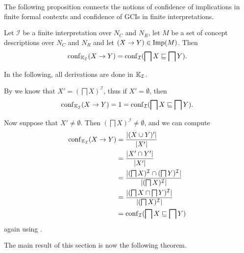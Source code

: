 The following proposition connects the notions of confidence of implications in finite
formal contexts and confidence of GCIs in finite interpretations.

\begin{Proposition}
  \label{prop:confidence-in-interpretation-is-the-same-as-in-induced-context}
  Let $\mathcal{I}$ be a finite interpretation over $N_C$ and $N_R$, let $M$ be a set of
  concept descriptions over $N_C$ and $N_R$ and let $(X \to Y) \in \operatorname{Imp}(M)$.  Then
  \begin{equation*}
    \operatorname{conf}_{{\mathbb{K}}_{\mathcal{I}}}( X \to Y ) = \operatorname{conf}_{\mathcal{I}}( \bigsqcap X \sqsubseteq
    \bigsqcap Y ).
  \end{equation*}
\end{Proposition}
\begin{Proof}
  In the following, all derivations are done in ${\mathbb{K}}_{\mathcal{I}}$.
  
  By  we know that $X' = (\bigsqcap X)^{\mathcal{I}}$,
  thus if $X' = \emptyset$, then
  \begin{equation*}
    \operatorname{conf}_{{\mathbb{K}}_{\mathcal{I}}}( X \to Y ) = 1 = \operatorname{conf}_{\mathcal{I}}( \bigsqcap X
    \sqsubseteq \bigsqcap Y ).
  \end{equation*}

  Now suppose that $X' \neq \emptyset$.  Then $(\bigsqcap X)^{\mathcal{I}} \neq
  \emptyset$, and we can compute
  \begin{align*}
    \operatorname{conf}_{{\mathbb{K}}_{\mathcal{I}}}( X \to Y )
    &= \frac{ \lvert (X \cup Y)' \rvert }{ \lvert X' \rvert } \\
    &= \frac{ \lvert X' \cap Y' \rvert }{ \lvert X' \rvert } \\
    &= \frac{ \lvert (\bigsqcap X)^{\mathcal{I}} \cap (\bigsqcap Y)^{\mathcal{I}} \rvert }{
      \lvert (\bigsqcap X)^{\mathcal{I}} \rvert } \\
    &= \frac{ \lvert (\bigsqcap X \sqcap \bigsqcap Y)^{\mathcal{I}} \rvert }{ \lvert (\bigsqcap
        X)^{\mathcal{I}} \rvert } \\
    &= \operatorname{conf}_{\mathcal{I}} (\bigsqcap X \sqsubseteq \bigsqcap Y)
  \end{align*}
  again using .
\end{Proof}

The main result of this section is now the following theorem.

